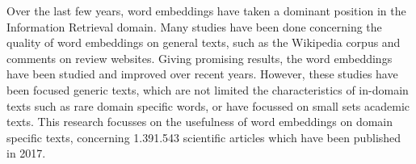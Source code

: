 \documentclass[../../Thesis.tex]{subfiles}
\begin{document}
Over the last few years, word embeddings have taken a dominant position in the Information Retrieval domain. Many studies have been done concerning the quality of word embeddings on general texts, such as the Wikipedia corpus and comments on review websites. Giving promising results, the word embeddings have been studied and improved over recent years. However, these studies have been focused generic texts, which are not limited the characteristics of in-domain texts such as rare domain specific words, or have focussed on small sets academic texts. This research focusses on the usefulness of word embeddings on domain specific texts, concerning 1.391.543 scientific articles which have been published in 2017.
\end{document}
